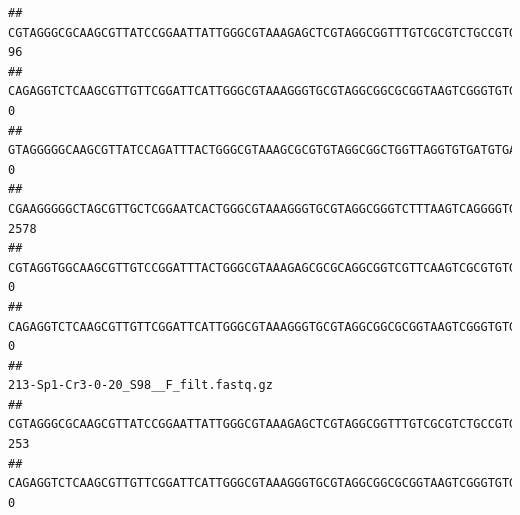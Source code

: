 \documentclass[]{article}
\begin{document}
\begin{verbatim}
## CGTAGGGCGCAAGCGTTATCCGGAATTATTGGGCGTAAAGAGCTCGTAGGCGGTTTGTCGCGTCTGCCGTGAAAGTCCGGGGCTCAACTCCGGATCTGCGGTGGGTACGGGCAGACTAGAGTGATGTAGGGGAGACTGGAATTCCTGGTGTAGCGGTGAAATGCGCAGATATCAGGAGGAACACCGATGGCGAAGGCAGGTCTCTGGGCATTAACTGACGCTGAGGAGCGAAAGCATGGGGAGCGAACA                                    96
## CAGAGGTCTCAAGCGTTGTTCGGATTCATTGGGCGTAAAGGGTGCGTAGGCGGCGCGGTAAGTCGGGTGTGAAATCTCGGAGCTTAACTCCGAAACTGCATTCGATACTGCCGTGCTTGAGGACTGGAGAGGAGACTGGAATTTACGGTGTAGCGGTGAAATGCGTAGATATCGTAAGGAAGACCAGTGGCGAAGGCGGGTCTCTGGACAGTTCCTGACGCTGAGGCACGAAGGCCAGGGGAGCAAACG                                     0
## GTAGGGGGCAAGCGTTATCCAGATTTACTGGGCGTAAAGCGCGTGTAGGCGGCTGGTTAGGTGTGATGTGAAATCTTCCGGCTCAACCGGAAAACTGCATTGCAAACCGGCCTGGCTAGAGTGCAGGAGAGGGAAGCGGAATTCCAGGTGTAGCGGTGAAATGCGTAGATATCTGGAGGAACACCAGTGGCGAAGGCGGCTTCCTGGCCTGCAACTGACGCTGAGACGCGAAAGCGTGGGGAGCGAAC                                      0
## CGAAGGGGGCTAGCGTTGCTCGGAATCACTGGGCGTAAAGGGTGCGTAGGCGGGTCTTTAAGTCAGGGGTGAAATCCTGGAGCTCAACTCCAGAACTGCCTTTGATACTGAAGATCTTGAGTTCGGGAGAGGTGAGTGGAACTGCGAGTGTAGAGGTGAAATTCGTAGATATTCGCAAGAACACCAGTGGCGAAGGCGGCTCACTGGCCCGATACTGACGCTGAGGCACGAAAGCGTGGGGAGCAAACA                                  2578
## CGTAGGTGGCAAGCGTTGTCCGGATTTACTGGGCGTAAAGAGCGCGCAGGCGGTCGTTCAAGTCGCGTGTGAAAGCCCCCGGCTCAACTGGGGAGGGTCACGCGATACTGATCGACTCGAAGGCAGGAGAGGGTAGTGGAATTCCCGGTGTAGTGGTGAAATGCGTAGATATCGGGAGGAACACCAGTGGCGAAGGCGACTACCTGGCCTGTTCTTGACGCTGAGGCGCGAAAGCTAGGGGAGCAAACG                                     0
## CAGAGGTCTCAAGCGTTGTTCGGATTCATTGGGCGTAAAGGGTGCGTAGGCGGCGCGGTAAGTCGGGTGTGAAATCTCGGGGCTTAACTCCGAAACTGCATTCGATACTGCCGTGCTTGAGGACTGGAGAGGAGACTGGAATTTACGGTGTAGCGGTGAAATGCGTAGATATCGTAAGGAAGACCAGTGGCGAAGGCGGGTCTCTGGACAGTTCCTGACGCTGAGGCACGAAGGCCAGGGGAGCAAACG                                     0
##                                                                                                                                                                                                                                                           213-Sp1-Cr3-0-20_S98__F_filt.fastq.gz
## CGTAGGGCGCAAGCGTTATCCGGAATTATTGGGCGTAAAGAGCTCGTAGGCGGTTTGTCGCGTCTGCCGTGAAAGTCCGGGGCTCAACTCCGGATCTGCGGTGGGTACGGGCAGACTAGAGTGATGTAGGGGAGACTGGAATTCCTGGTGTAGCGGTGAAATGCGCAGATATCAGGAGGAACACCGATGGCGAAGGCAGGTCTCTGGGCATTAACTGACGCTGAGGAGCGAAAGCATGGGGAGCGAACA                                   253
## CAGAGGTCTCAAGCGTTGTTCGGATTCATTGGGCGTAAAGGGTGCGTAGGCGGCGCGGTAAGTCGGGTGTGAAATCTCGGAGCTTAACTCCGAAACTGCATTCGATACTGCCGTGCTTGAGGACTGGAGAGGAGACTGGAATTTACGGTGTAGCGGTGAAATGCGTAGATATCGTAAGGAAGACCAGTGGCGAAGGCGGGTCTCTGGACAGTTCCTGACGCTGAGGCACGAAGGCCAGGGGAGCAAACG                                     0

\end{verbatim}
\end{document}
